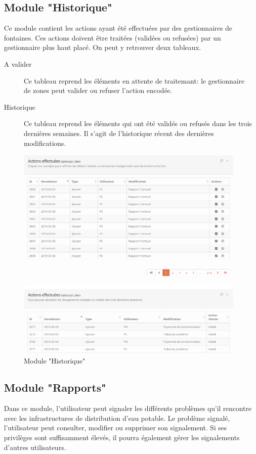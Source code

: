 \documentclass{EPL-master-thesis-covers-FR}
\begin{document}
			
			\subsection{Module "Historique"}
			\label{sec:historique}
				Ce module contient les actions ayant été effectuées par des gestionnaires de fontaines. Ces actions doivent être traitées (validées ou refusées) par un gestionnaire plus haut placé. On peut y retrouver deux tableaux.
				\begin{description}
					\item[A valider] Ce tableau reprend les éléments en attente de traitemant: le gestionnaire de zones peut valider ou refuser l'action encodée.
					\item[Historique] Ce tableau reprend les éléments qui ont été validés ou refusés dans les trois dernières semaines. Il s'agit de l'historique récent des dernières modifications.
				\end{description}
				\begin{figure}[H]
					\centering
					\includegraphics[width=1\textwidth]{images/logs}
					\caption{Module "Historique"}
				\end{figure}
				
			
			\subsection{Module "Rapports"}
				Dans ce module, l'utilisateur peut signaler les différents problèmes qu'il rencontre avec les infrastructures de distribution d'eau potable. Le problème signalé, l'utilisateur peut consulter, modifier ou supprimer son signalement. Si ses privilèges sont suffisamment élevés, il pourra également gérer les signalements d'autres utilisateurs.
				
\end{document}
